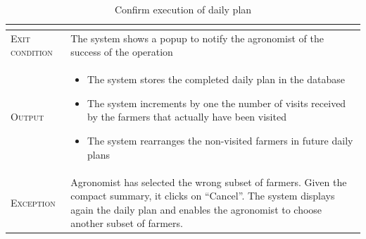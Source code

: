 \begin{table}[H]
\begin{tabular}[c]{|l|p{}|}
\begin{itemize}
                                        \end{itemize}\\
        \hline %
        \textsc{Exit condition}    &  The system shows a popup to notify the agronomist of the success of the operation
        \\
    	\hline %
    	\textsc{Output}             &  \begin{itemize}
    	    \item The system stores the completed daily plan in the database 
            \item The system increments by one the number of visits received by the farmers that actually have been visited
            \item The system rearranges the non-visited farmers in future daily plans

    	\end{itemize}\\
    	\hline %
    	\textsc{Exception}         &  Agronomist has selected the wrong subset of farmers. Given the compact summary, it clicks on “Cancel”. The system displays again the daily plan and enables the agronomist to choose another subset of farmers.\\
    	
    	\hline %
        
    \end{tabular}
    \caption{\label{tab:confirm_deviations_section}Confirm execution of daily plan}
\end{table}

